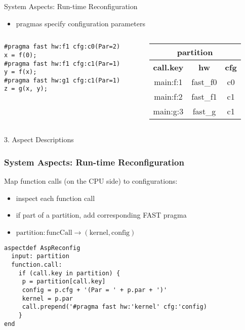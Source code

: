 \begin{frame}[fragile]{System Aspects: Run-time Reconfiguration}
  \begin{itemize}
    \setlength{\itemsep}{8pt}
  \item pragmas specify configuration parameters
\end{itemize}
    \begin{columns}
      \begin{column}{.7\textwidth}
        \begin{center}
          \begin{lstlisting}[style=MaxC]
#pragma fast hw:f1 cfg:c0(Par=2)
x = f(0);
#pragma fast hw:f1 cfg:c1(Par=1)
y = f(x);
#pragma fast hw:g1 cfg:c1(Par=1)
z = g(x, y);
          \end{lstlisting}
        \end{center}
      \end{column}
      \begin{column}{.3\textwidth}
        {\footnotesize
          \begin{table}[!h]
            \renewcommand{\arraystretch}{1.3}
            \hspace{-2cm}
            \begin{tabular}{c|c|c}
              \multicolumn{3}{c}{\bf{partition}} \\
              \hline
              \bf{call.key} & \bf{hw} & \bf{cfg}  \\
              \hline
              main:f:1 & fast\_f0 & c0 \\
              main:f:2 & fast\_f1 & c1 \\
              main:g:3 & fast\_g & c1 \\
            \end{tabular}
          \end{table}
        }
      \end{column}
    \end{columns}

\end{frame}

\begin{frame}[fragile]{3. Aspect Descriptions}
  \frametitle{ System Aspects: Run-time Reconfiguration}
  Map function calls (on the CPU side) to configurations:
  \begin{itemize}
  \item inspect each function call
  \item if part of a partition, add corresponding FAST pragma
  \item $ \text{partition} : \text{funcCall} \rightarrow (\text{kernel}, \text{config}) $
  \end{itemize}

  \begin{lstlisting}[style=lara]
aspectdef AspReconfig
  input: partition
  function.call:
    if (call.key in partition) {
     p = partition[call.key]
     config = p.cfg + '(Par = ' + p.par + ')'
     kernel = p.par
     call.prepend('#pragma fast hw:'kernel' cfg:'config)
    }
end
  \end{lstlisting}
\end{frame}


